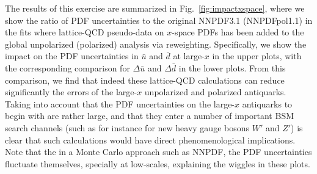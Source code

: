 The results of this exercise are summarized
in Fig.~\ref{fig:impactxspace}, where we show the
ratio of PDF uncertainties to the original
  NNPDF3.1 (NNPDFpol1.1) in the fits where lattice-QCD pseudo-data
  on $x$-space PDFs has been added to the global unpolarized
  (polarized) analysis via reweighting.
  Specifically, we show the impact on the PDF uncertainties
  in $\bar{u}$ and $\bar{d}$ at large-$x$ in the upper
  plots, with the corresponding comparison for $\Delta\bar{u}$
  and $\Delta\bar{d}$ in the lower plots.
  From this comparison, we find that
  indeed these lattice-QCD calculations can reduce significantly
  the errors of the large-$x$ unpolarized and polarized
  antiquarks.
  Taking into account that the PDF uncertainties on the large-$x$
  antiquarks to begin with are rather large, and that they
  enter a number of important BSM search channels
  (such as for instance for new heavy gauge bosons $W'$ and $Z'$)
  is clear that such calculations would have direct
  phenomenological implications.
  Note that the in a Monte Carlo approach such as NNPDF, the
PDF uncertainties fluctuate themselves, specially at low-scales,
explaining the wiggles in these plots.

